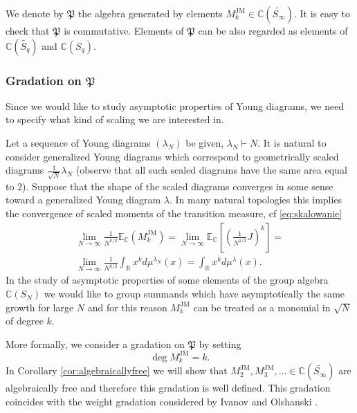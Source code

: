 \documentclass[12pt,dvips]{amsart}
\numberwithin{equation}{section} \numberwithin{figure}{section}
\theoremstyle{plain}
\theoremstyle{definition}
\theoremstyle{remark}
\newcommand{\E}{{\mathbb{E}}}
\newcommand{\C}{{\mathbb{C}}}
\newcommand{\R}{{\mathbb{R}}}
\newcommand{\Sn}[1]{{{S}}_{#1}}
\newcommand{\MJM}{M^{\JM}}
\newcommand{\PartPerm}[1]{\widetilde{\Sn{#1}}}
\newcommand{\myalgebra}{\mathfrak{P}}
\DeclareMathOperator{\JM}{JM}
\begin{document}

We denote by $\myalgebra$ the algebra generated by elements
$\MJM_k\in\C(\PartPerm{\infty})$. It is easy to check that
$\myalgebra$ is commutative. \index{$P$@$\myalgebra$} Elements of
$\myalgebra$ can be also regarded as elements of $\C(\PartPerm{q})$
and $\C(\Sn{q})$.



\subsubsection{Gradation on $\myalgebra$} \label{subsec:degree1}
Since we would like to study asymptotic properties of Young
diagrams, we need to specify what kind of scaling we are interested
in.

Let a sequence of Young diagrams $(\lambda_N)$ be given,
$\lambda_N\vdash N$. It is natural to consider generalized Young
diagrams which correspond to geometrically scaled diagrams
$\frac{1}{\sqrt{N}} \lambda_N$ (observe that all such scaled
diagrams have the same area equal to $2$). Suppose that the shape of
the scaled diagrams converges in some sense toward a generalized
Young diagram $\lambda$. In many natural topologies this implies the
convergence of scaled moments of the transition measure, cf
\eqref{eq:skalowanie}
\begin{multline*}
\lim_{N\rightarrow\infty} \frac{1}{N^{k/2}} \E_\C (\MJM_k)=
 \lim_{N\rightarrow\infty} \E_{\C} \left[ \left( \frac{1}{N^{1/2}} J \right)^k \right]=
\\
\lim_{N\rightarrow\infty} \frac{1}{N^{k/2}} \int_\R x^k
d\mu^{\lambda_N}(x) =  \int_\R x^k d\mu^{\lambda}(x).
\end{multline*}
In the study of asymptotic properties of some elements of the group
algebra $\C(\Sn{N})$ we would like to group summands which have
asymptotically the same growth for large $N$ and for this reason
$\MJM_k$ can be treated as a monomial in ${\sqrt{N}}$ of degree $k$.

More formally, we consider a gradation  on
$\myalgebra$ by setting
\begin{equation} \label{eq:gradation} \deg \MJM_k=k.
\end{equation}
In Corollary \ref{cor:algebraicallyfree} we will show that
$\MJM_2,\MJM_3,\dots\in\C(\PartPerm{\infty})$ are algebraically free
and therefore this gradation is well defined. This gradation
coincides with the weight gradation considered by Ivanov and
Olshanski \cite{IvanovOlshanski2002}.
\end{document}
